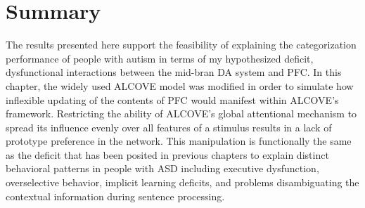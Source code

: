 \section{Summary}

The results presented here support the feasibility of explaining the categorization performance of people with autism in terms of my hypothesized deficit, dysfunctional interactions between the mid-bran DA system and PFC.  In this chapter, the widely used ALCOVE model was modified in order to simulate how inflexible updating of the contents of PFC would manifest within ALCOVE's framework. Restricting the ability of ALCOVE's global attentional mechanism to spread its influence evenly over all features of a stimulus results in a lack of prototype preference in the network.  This manipulation is functionally the same as the deficit that has been posited in previous chapters to explain distinct behavioral patterns in people with ASD including executive dysfunction, overselective behavior, implicit learning deficits, and problems disambiguating the contextual information during sentence processing.      

